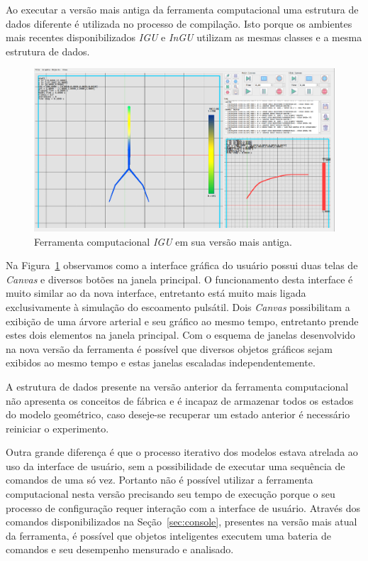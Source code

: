 Ao executar a versão mais antiga da ferramenta computacional uma estrutura de dados diferente é utilizada no processo de compilação. Isto porque os ambientes mais recentes disponibilizados \textit{IGU} e \textit{InGU} utilizam as mesmas classes e a mesma estrutura de dados.


\begin{figure}[!htbp]
	\centering
	\includegraphics[width=\linewidth]{Figures/IGU_old2.png}
	\caption{Ferramenta computacional \textit{IGU} em sua versão mais antiga.}
	\label{fig:IGU-old}
\end{figure}

Na Figura~\ref{fig:IGU-old} observamos como a interface gráfica do usuário possui duas telas de \textit{Canvas} e diversos botões na janela principal. O funcionamento desta interface é muito similar ao da nova interface, entretanto está muito mais ligada exclusivamente à simulação do escoamento pulsátil. Dois \textit{Canvas} possibilitam a exibição de uma árvore arterial e seu gráfico ao mesmo tempo, entretanto prende estes dois elementos na janela principal. Com o esquema de janelas desenvolvido na nova versão da ferramenta é possível que diversos objetos gráficos sejam exibidos ao mesmo tempo e estas janelas escaladas independentemente.

A estrutura de dados presente na versão anterior da ferramenta computacional não apresenta os conceitos de fábrica e é incapaz de armazenar todos os estados do modelo geométrico, caso deseje-se recuperar um estado anterior é necessário reiniciar o experimento.

Outra grande diferença é que o processo iterativo dos modelos estava atrelada ao uso da interface de usuário, sem a possibilidade de executar uma sequência de comandos de uma só vez. Portanto não é possível utilizar a ferramenta computacional nesta versão precisando seu tempo de execução porque o seu processo de configuração requer interação com a interface de usuário. Através dos comandos disponibilizados na Seção~\ref{sec:console}, presentes na versão mais atual da ferramenta, é possível que objetos inteligentes executem uma bateria de comandos e seu desempenho mensurado e analisado.

